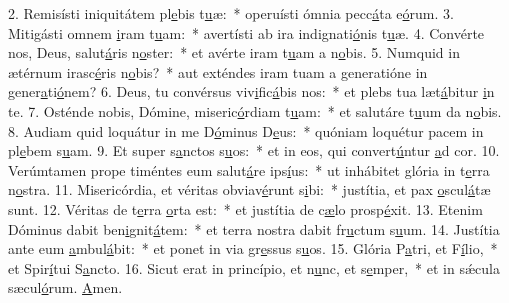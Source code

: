 2. Remisísti iniquitátem pl\uline{e}bis t\uline{u}æ:~* operuísti ómnia pecc\uline{á}ta e\uline{ó}rum.
3. Mitigásti omnem \uline{i}ram t\uline{u}am:~* avertísti ab ira indignati\uline{ó}nis t\uline{u}æ.
4. Convérte nos, Deus, salut\uline{á}ris n\uline{o}ster:~* et avérte iram t\uline{u}am a n\uline{o}bis.
5. Numquid in ætérnum irasc\uline{é}ris n\uline{o}bis?~* aut exténdes iram tuam a generatióne in gener\uline{a}ti\uline{ó}nem?
6. Deus, tu convérsus viv\uline{i}fic\uline{á}bis nos:~* et plebs tua læt\uline{á}bitur \uline{i}n te.
7. Osténde nobis, Dómine, miseric\uline{ó}rdiam t\uline{u}am:~* et salutáre t\uline{u}um da n\uline{o}bis.
8. Audiam quid loquátur in me D\uline{ó}minus D\uline{e}us:~* quóniam loquétur pacem in pl\uline{e}bem s\uline{u}am.
9. Et super s\uline{a}nctos s\uline{u}os:~* et in eos, qui convert\uline{ú}ntur \uline{a}d cor.
10. Verúmtamen prope timéntes eum salut\uline{á}re ips\uline{í}us:~* ut inhábitet glória in t\uline{e}rra n\uline{o}stra.
11. Misericórdia, et véritas obviav\uline{é}runt s\uline{i}bi:~* justítia, et pax \uline{o}scul\uline{á}tæ sunt.
12. Véritas de t\uline{e}rra \uline{o}rta est:~* et justítia de c\uline{æ}lo prosp\uline{é}xit.
13. Etenim Dóminus dabit ben\uline{i}gnit\uline{á}tem:~* et terra nostra dabit fr\uline{u}ctum s\uline{u}um.
14. Justítia ante eum \uline{a}mbul\uline{á}bit:~* et ponet in via gr\uline{e}ssus s\uline{u}os.
15. Glória P\uline{a}tri, et F\uline{í}lio,~* et Spir\uline{í}tui S\uline{a}ncto.
16. Sicut erat in princípio, et n\uline{u}nc, et s\uline{e}mper,~* et in sǽcula sæcul\uline{ó}rum. \uline{A}men.
